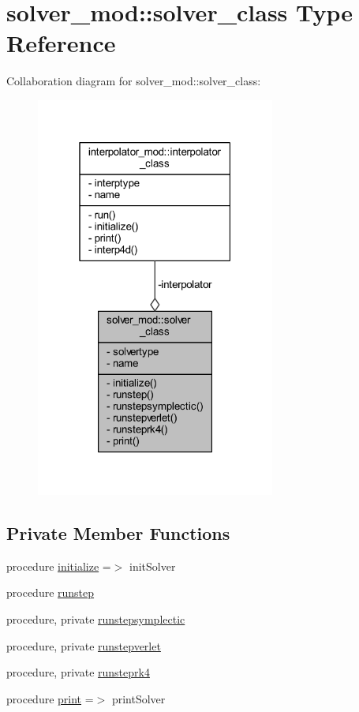 \hypertarget{structsolver__mod_1_1solver__class}{}\section{solver\+\_\+mod\+:\+:solver\+\_\+class Type Reference}
\label{structsolver__mod_1_1solver__class}


Collaboration diagram for solver\+\_\+mod\+:\+:solver\+\_\+class\+:\nopagebreak
\begin{figure}[H]
\begin{center}
\leavevmode
\includegraphics[width=223pt]{structsolver__mod_1_1solver__class__coll__graph}
\end{center}
\end{figure}
\subsection*{Private Member Functions}
\begin{DoxyCompactItemize}
\item 
procedure \mbox{\hyperlink{structsolver__mod_1_1solver__class_a9ac72acd3e4fbb8881c7eaabe9e3d585}{initialize}} =$>$ init\+Solver
\item 
procedure \mbox{\hyperlink{structsolver__mod_1_1solver__class_a54ee0f169b626d3fb484d79cce91c3be}{runstep}}
\item 
procedure, private \mbox{\hyperlink{structsolver__mod_1_1solver__class_a5a6bdb2ea0ab6adb0c1ef29b7c4c02a6}{runstepsymplectic}}
\item 
procedure, private \mbox{\hyperlink{structsolver__mod_1_1solver__class_a0e32c00f2a75c3701f66f83d4682bc6f}{runstepverlet}}
\item 
procedure, private \mbox{\hyperlink{structsolver__mod_1_1solver__class_a58c86ed273b0b9141e74cc55b59377a3}{runsteprk4}}
\item 
procedure \mbox{\hyperlink{structsolver__mod_1_1solver__class_ac61135f89371079744ac9b5fd8da8a41}{print}} =$>$ print\+Solver
\end{DoxyCompactItemize}
